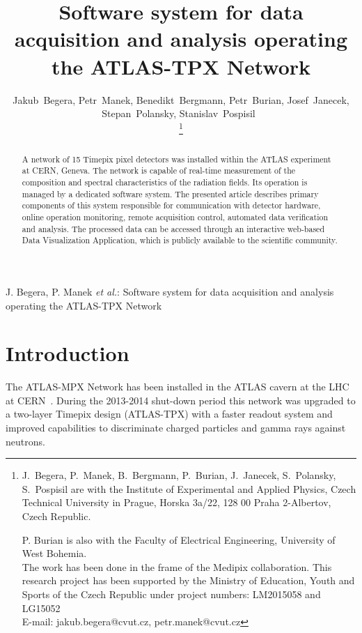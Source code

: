 \documentclass[journal]{IEEEtran}
\begin{document}
\title{Software system for data acquisition and analysis operating the ATLAS-TPX Network}

\author{Jakub~Begera, Petr~Manek, Benedikt~Bergmann, Petr~Burian, Josef~Janecek, Stepan~Polansky, Stanislav~Pospisil~

\thanks{J.~Begera, P.~Manek, B.~Bergmann, P.~Burian, J.~Janecek, S.~Polansky, S.~Pospisil are with the Institute of Experimental and Applied Physics, Czech Technical University in Prague, Horska 3a/22, 128 00 Praha 2-Albertov, Czech Republic.

P. Burian is also with the Faculty of Electrical Engineering, University of West Bohemia.\protect\\
The work has been done in the frame of the Medipix collaboration. This research project has been supported by the Ministry of Education, Youth and Sports of the Czech Republic under project numbers: LM2015058 and LG15052\protect\\
E-mail: jakub.begera@cvut.cz, petr.manek@cvut.cz}
}

\markboth{}%
{J. Begera, P. Manek \MakeLowercase{\textit{et al.}}: Software system for data acquisition and analysis operating the ATLAS-TPX Network}


\maketitle


\begin{abstract}
A network of 15 Timepix pixel detectors was installed within the ATLAS experiment at CERN, Geneva. The network is capable of real-time measurement of the composition and spectral characteristics of the radiation fields. Its operation is managed by a dedicated software system. The presented article describes primary components of this system responsible for communication with detector hardware, online operation monitoring, remote acquisition control, automated data verification and analysis. The processed data can be accessed through an interactive web-based Data Visualization Application, which is publicly available to the scientific community.
\end{abstract}

\section{\label{sec:introduction}Introduction}
The ATLAS-MPX Network has been installed in the ATLAS cavern at the LHC at CERN~\cite{CampbellATLAS}. During the 2013-2014 shut-down period this network was upgraded to a two-layer Timepix design (ATLAS-TPX) with a faster readout system and improved capabilities to discriminate charged particles and gamma rays against neutrons.
\end{document}
